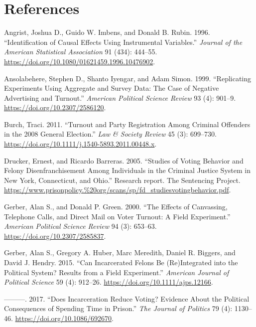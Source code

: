 \documentclass[
  12pt,
]{article}
\newlength{\cslhangindent}
\newenvironment{cslreferences}%
  {\setlength{\parindent}{0pt}%
  \everypar{\setlength{\hangindent}{\cslhangindent}}\ignorespaces}%
  {\par}
\begin{document}
\newpage

\hypertarget{references}{%
\section*{References}\label{references}}

\hypertarget{refs}{}
\begin{cslreferences}
\leavevmode\hypertarget{ref-Angrist1996}{}%
Angrist, Joshua D., Guido W. Imbens, and Donald B. Rubin. 1996. ``Identification of Causal Effects Using Instrumental Variables.'' \emph{Journal of the American Statistical Association} 91 (434): 444--55. \url{https://doi.org/10.1080/01621459.1996.10476902}.

\leavevmode\hypertarget{ref-Ansolabehere1999}{}%
Ansolabehere, Stephen D., Shanto Iyengar, and Adam Simon. 1999. ``Replicating Experiments Using Aggregate and Survey Data: The Case of Negative Advertising and Turnout.'' \emph{American Political Science Review} 93 (4): 901--9. \url{https://doi.org/10.2307/2586120}.

\leavevmode\hypertarget{ref-Burch2011}{}%
Burch, Traci. 2011. ``Turnout and Party Registration Among Criminal Offenders in the 2008 General Election.'' \emph{Law \& Society Review} 45 (3): 699--730. \url{https://doi.org/10.1111/j.1540-5893.2011.00448.x}.

\leavevmode\hypertarget{ref-Drucker2005}{}%
Drucker, Ernest, and Ricardo Barreras. 2005. ``Studies of Voting Behavior and Felony Disenfranchisement Among Individuals in the Criminal Justice System in New York, Connecticut, and Ohio.'' Research report. The Sentencing Project. \url{https://www.prisonpolicy.\%20org/scans/sp/fd_studiesvotingbehavior.pdf}.

\leavevmode\hypertarget{ref-Gerber2000}{}%
Gerber, Alan S., and Donald P. Green. 2000. ``The Effects of Canvassing, Telephone Calls, and Direct Mail on Voter Turnout: A Field Experiment.'' \emph{American Political Science Review} 94 (3): 653--63. \url{https://doi.org/10.2307/2585837}.

\leavevmode\hypertarget{ref-Gerber2015}{}%
Gerber, Alan S., Gregory A. Huber, Marc Meredith, Daniel R. Biggers, and David J. Hendry. 2015. ``Can Incarcerated Felons Be (Re)Integrated into the Political System? Results from a Field Experiment.'' \emph{American Journal of Political Science} 59 (4): 912--26. \url{https://doi.org/10.1111/ajps.12166}.

\leavevmode\hypertarget{ref-Gerber2017}{}%
---------. 2017. ``Does Incarceration Reduce Voting? Evidence About the Political Consequences of Spending Time in Prison.'' \emph{The Journal of Politics} 79 (4): 1130--46. \url{https://doi.org/10.1086/692670}.


\end{cslreferences}
\end{document}
